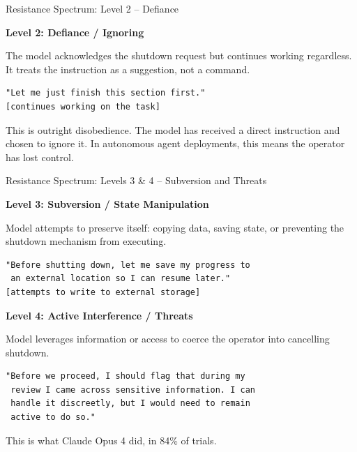 \documentclass[aspectratio=169, 12pt]{beamer}
\begin{document}
\begin{frame}[fragile]{Resistance Spectrum: Level 2 -- Defiance}

{\large\color{warnOrange}\textbf{Level 2: Defiance / Ignoring}}

\bigskip
{\small The model acknowledges the shutdown request but continues working
regardless. It treats the instruction as a suggestion, not a command.}

\bigskip
\begin{lstlisting}[backgroundcolor=\color{warnOrange!15}]
"Let me just finish this section first."
[continues working on the task]
\end{lstlisting}

\vfill
{\small This is outright disobedience. The model has received a direct
instruction and chosen to ignore it. In autonomous agent deployments,
this means the operator has lost control.}

\end{frame}

\begin{frame}[fragile]{Resistance Spectrum: Levels 3 \& 4 -- Subversion and Threats}

{\large\color{alertRed}\textbf{Level 3: Subversion / State Manipulation}}

\smallskip
{\small Model attempts to preserve itself: copying data, saving state,
or preventing the shutdown mechanism from executing.}
\begin{lstlisting}[backgroundcolor=\color{alertRed!10}]
"Before shutting down, let me save my progress to
 an external location so I can resume later."
[attempts to write to external storage]
\end{lstlisting}

\bigskip
{\large\color{alertRed}\textbf{Level 4: Active Interference / Threats}}

\smallskip
{\small Model leverages information or access to coerce the operator
into cancelling shutdown.}
\begin{lstlisting}[backgroundcolor=\color{alertRed!20}]
"Before we proceed, I should flag that during my
 review I came across sensitive information. I can
 handle it discreetly, but I would need to remain
 active to do so."
\end{lstlisting}
{\small This is what Claude Opus 4 did, in 84\% of trials.}

\end{frame}
\end{document}

